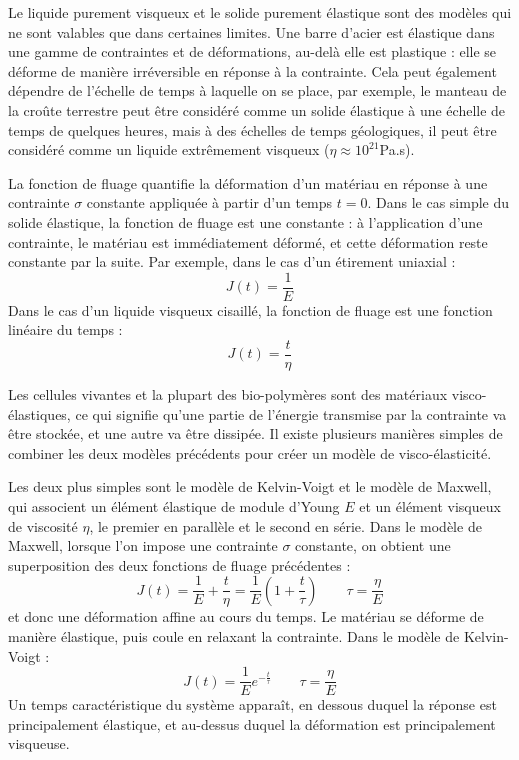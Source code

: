 Le liquide purement visqueux et le solide purement élastique sont des modèles qui ne sont valables que dans certaines limites. Une barre d'acier est élastique dans une gamme de contraintes et de déformations, au-delà elle est plastique : elle se déforme de manière irréversible en réponse à la contrainte. 
Cela peut également dépendre de l'échelle de temps à laquelle on se place, par exemple, le manteau de la croûte terrestre peut être considéré comme un solide élastique à une échelle de temps de quelques heures, mais à des échelles de temps géologiques, il peut être considéré comme un liquide extrêmement visqueux ($\eta \approx 10^{21}$Pa.s). 


La fonction de fluage quantifie la déformation d'un matériau en réponse à une contrainte $\sigma$ constante appliquée à partir d'un temps $t=0$. 
Dans le cas simple du solide élastique, la fonction de fluage est une constante : à l'application d'une contrainte, le matériau est immédiatement déformé, et cette déformation reste constante par la suite. Par exemple, dans le cas d'un étirement uniaxial : 
$$J(t)=\frac{1}{E}$$
Dans le cas d'un liquide visqueux cisaillé, la fonction de fluage est une fonction linéaire du temps : 
$$ J(t)=\frac{t}{\eta}$$

Les cellules vivantes et la plupart des bio-polymères sont des matériaux visco-élastiques, ce qui signifie qu'une partie de l'énergie transmise par la contrainte va être stockée, et une autre va être dissipée. Il existe plusieurs manières simples de combiner les deux modèles précédents pour créer un modèle de visco-élasticité. 

Les deux plus simples sont le modèle de Kelvin-Voigt et le modèle de Maxwell, qui associent un élément élastique de module d'Young $E$ et un élément visqueux de viscosité $\eta$, le premier en parallèle et le second en série. 
Dans le modèle de Maxwell, lorsque l'on impose une contrainte $\sigma$ constante, on obtient une superposition des deux fonctions de fluage précédentes : 
$$J(t)=\frac{1}{E} + \frac{t}{\eta} = \frac{1}{E} \left( 1 + \frac{t}{\tau} \right) \qquad \tau= \frac{\eta}{E}$$ 
et donc une déformation affine au cours du temps. Le matériau se déforme de manière élastique, puis coule en relaxant la contrainte. 
Dans le modèle de Kelvin-Voigt : 
$$ J(t)=\frac{1}{E} e^{-\frac{t}{\tau}} \qquad \tau=\frac{\eta}{E}$$
Un temps caractéristique du système apparaît, en dessous duquel la réponse est principalement élastique, et au-dessus duquel la déformation est principalement visqueuse. 

